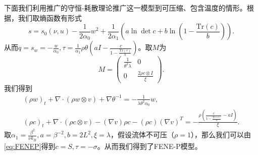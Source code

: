 \documentclass{article}
\begin{document}
	下面我们利用推广的守恒-耗散理论推广这一模型到可压缩、包含温度的情形。根据\cite{}，我们取熵函数有形式
	\begin{equation*}
		s = s_0(\nu,u)  - \frac{1}{2  \alpha_0} w^2 + \frac{1}{2 \alpha_1} (a \ln \det c + b \ln(1-\frac{\mbox{Tr}(c)}{b})).
	\end{equation*}
	从而$q=s_w=-\frac{ w}{\alpha_0},\tau = \frac{1}{\alpha_1} \rho \theta (a I-\frac{c}{1-\frac{\mbox{Tr}(c)}{b}})$。取$M$为
	\begin{equation*}
		M = \left( \begin{array}{ccc} 
			\frac{1}{\theta^2 \lambda} & 0 \\
			0 &  \frac{2 \rho  c \otimes I}{\xi}   
		\end{array} \right).
	\end{equation*}
	我们得到
	\begin{eqnarray*}
			(\rho w)_t + \nabla \cdot (\rho w \otimes v) + \nabla \theta^{-1} = -\frac{1}{\lambda \theta^2 \alpha_0} w, \\
			(\rho c)_t +  \nabla \cdot (\rho c \otimes v) - (\nabla v) \rho c - (\rho c) (\nabla v)^T  = -\frac{\rho (\frac{c}{1-\frac{\mbox{Tr}(c)}{b}}-a I) }{\xi}.
	\end{eqnarray*}
	取$\alpha_1 = \frac{\beta^2}{\nu k_B},a=\beta^{-2},b=2L^2,\xi = \lambda$，假设流体不可压（$\rho=1$），那么我们可以由\eqref{eq:FENEP}得到$c=S,\tau = -\sigma$。从而我们得到了FENE-P模型。
\end{document}
